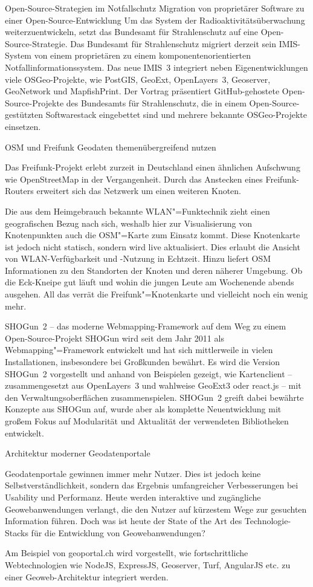 %
{Open-Source-Strategien im Notfallschutz}%
{Migration von proprietärer Software zu einer Open-Source-Entwicklung}%
{Um das System der Radioaktivitätsüberwachung weiterzuentwickeln, setzt das Bundesamt für
Strahlenschutz auf eine Open-Source-Strategie. Das Bundesamt für Strahlenschutz migriert derzeit sein IMIS-System von
einem proprietären zu einem komponentenorientierten Notfallinformationssystem. Das neue IMIS~3
integriert neben Eigenentwicklungen viele OSGeo-Projekte, wie PostGIS, GeoExt, OpenLayers~3,
Geoserver, GeoNetwork und MapfishPrint. Der Vortrag präsentiert GitHub-gehostete
Open-Source-Projekte des Bundesamts für Strahlenschutz, die in einem
Open-Source-gestützten Softwarestack eingebettet sind und mehrere bekannte
OSGeo-Projekte einsetzen.}


%
{OSM und Freifunk}%
{Geodaten themenübergreifend nutzen}%
{%
Das Freifunk-Projekt erlebt zurzeit in Deutschland einen ähnlichen Aufschwung
wie OpenStreetMap in der Vergangenheit.
Durch das Anstecken eines Freifunk-Routers erweitert sich das Netzwerk um einen
weiteren Knoten.

Die aus dem
Heimgebrauch bekannte WLAN"=Funktechnik zieht einen
geografischen Bezug nach sich, weshalb hier zur Visualisierung von
Knotenpunkten auch die OSM"=Karte zum Einsatz kommt. Diese Knotenkarte ist jedoch
nicht statisch,
sondern wird live aktualisiert.
Dies erlaubt die Ansicht von WLAN-Verfügbarkeit und -Nutzung
in Echtzeit.
Hinzu liefert OSM Informationen zu den Standorten der Knoten und
deren näherer Umgebung. Ob die
Eck-Kneipe gut läuft und wohin die jungen Leute am Wochenende abends ausgehen.
All das verrät die
Freifunk"=Knotenkarte und vielleicht noch ein wenig mehr.}

%
{SHOGun~2 -- das moderne Webmapping-Framework}%
{auf dem Weg zu einem Open-Source-Projekt}%
{SHOGun wird seit dem Jahr 2011 als Webmapping"=Framework entwickelt und hat sich mittlerweile in
  vielen Installationen, insbesondere bei Großkunden bewährt.  Es wird die Version SHOGun~2
  vorgestellt und anhand von Beispielen gezeigt, wie Kartenclient --
zusammengesetzt aus OpenLayers~3 und wahlweise GeoExt3 oder react.js -- mit den
Verwaltungsoberflächen zusammenspielen.  SHOGun~2 greift dabei bewährte Konzepte aus SHOGun auf,
wurde aber als komplette Neuentwicklung mit großem Fokus auf Modularität und Aktualität der
verwendeten Bibliotheken entwickelt.}


%
{Architektur moderner Geodatenportale}%
{}%
{Geodatenportale gewinnen immer mehr Nutzer. Dies ist jedoch keine Selbstverständlichkeit, sondern
das Ergebnis umfangreicher Verbesserungen bei Usability und Performanz. Heute werden interaktive und
zugängliche Geowebanwendungen verlangt, die den Nutzer auf kürzestem Wege zur gesuchten Information
führen. Doch was ist heute der State of the Art des Technologie-Stacks für die Entwicklung von
Geowebanwendungen?

Am Beispiel von geoportal.ch wird vorgestellt, wie fortschrittliche
Webtechnologien wie NodeJS, ExpressJS, Geoserver, Turf, AngularJS etc. zu einer Geoweb-Architektur
integriert werden.}


